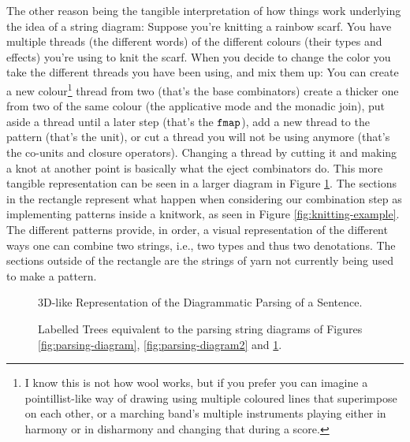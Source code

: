 The other reason being the tangible interpretation of how things work
underlying the idea of a string diagram:
Suppose you're knitting a rainbow scarf.
You have multiple threads (the different words) of the different colours (their
types and effects) you're using to knit the scarf.
When you decide to change the color you take the different threads you have
been using, and mix them up:
You can create a new colour\footnote{I know this is not how wool works, but
	if you prefer you can imagine a pointillist-like way of drawing using multiple
	coloured lines that superimpose on each other, or a marching band's multiple
	instruments playing either in harmony or in disharmony and changing that
	during a score.} thread from two (that's the base combinators) create a
thicker one from two of the same colour (the applicative mode and the monadic
join), put aside a thread until a later step (that's the $\texttt{fmap}$), add a new
thread to the pattern (that's the unit), or cut a thread you will not be
using anymore (that's the co-units and closure operators).
Changing a thread by cutting it and making a knot at another point is basically
what the eject combinators do.
This more tangible representation can be seen in a larger diagram in Figure
\ref{fig:3dparsing-diagram}.
The sections in the rectangle represent what happen when considering our
combination step as implementing patterns inside a knitwork, as seen in Figure
\ref{fig:knitting-example}.
The different patterns provide, in order, a visual representation of the
different ways one can combine two strings, i.e., two types and thus two
denotations.
The sections outside of the rectangle are the strings of yarn not currently
being used to make a pattern.

\begin{figure}
	\centering
	
	\caption{3D-like Representation of the Diagrammatic Parsing of a Sentence.}
	\label{fig:3dparsing-diagram}
\end{figure}

\begin{figure}
	\centering
	
	\caption{Labelled Trees equivalent to the parsing string diagrams of Figures
		\ref{fig:parsing-diagram}, \ref{fig:parsing-diagram2} and
		\ref{fig:3dparsing-diagram}.
	}
	\label{fig:parsing-trees}
\end{figure}

